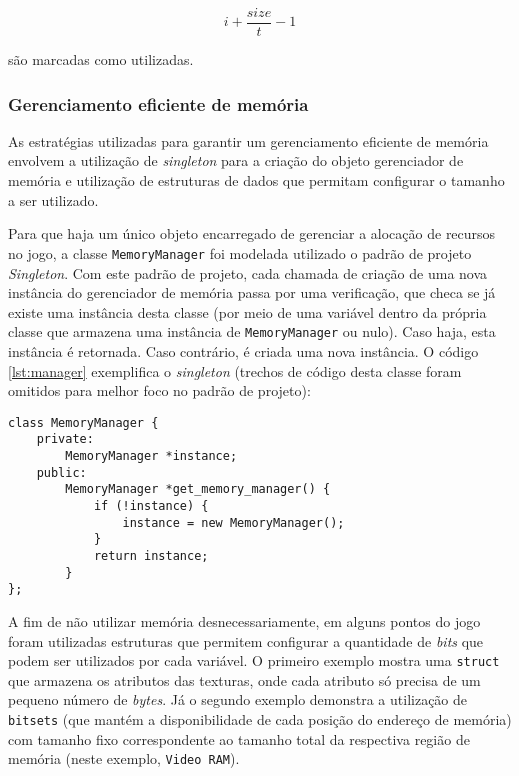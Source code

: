     \begin{equation} \label{Limite superior de alocação na memória de uma posição i}
    i + \frac{size}{t} - 1
    \end{equation}

    são marcadas como utilizadas.

    \subsubsection{Gerenciamento eficiente de memória}

    As estratégias utilizadas para garantir um gerenciamento eficiente de memória envolvem a utilização de \textit{singleton} para a criação do objeto gerenciador de memória e utilização de estruturas de dados que permitam configurar o tamanho a ser utilizado.

    Para que haja um único objeto encarregado de gerenciar a alocação de recursos no jogo, a classe \texttt{MemoryManager} foi modelada utilizado o padrão de projeto \textit{Singleton}. Com este padrão de projeto, cada chamada de criação de uma nova instância do gerenciador de memória passa por uma verificação, que checa se já existe uma instância desta classe (por meio de uma variável dentro da própria classe que armazena uma instância de \texttt{MemoryManager} ou nulo). Caso haja, esta instância é retornada. Caso contrário, é criada uma nova instância. O código \ref{lst:manager} exemplifica o \textit{singleton} (trechos de código desta classe foram omitidos para melhor foco no padrão de projeto):

\begin{lstlisting}[caption={\textit{Singleton} do gerenciador de memória.},label={lst:manager}]
class MemoryManager {
    private:
        MemoryManager *instance;
    public:
        MemoryManager *get_memory_manager() {
            if (!instance) {
                instance = new MemoryManager();
            }
            return instance;
        }
};
\end{lstlisting}

A fim de não utilizar memória desnecessariamente, em alguns pontos do jogo foram utilizadas estruturas que permitem configurar a quantidade de \textit{bits} que podem ser utilizados por cada variável. O primeiro exemplo mostra uma \texttt{struct} que armazena os atributos das texturas, onde cada atributo só precisa de um pequeno número de \textit{bytes}. Já o segundo exemplo demonstra a utilização de \texttt{bitsets} (que mantém a disponibilidade de cada posição do endereço de memória) com tamanho fixo correspondente ao tamanho total da respectiva região de memória (neste exemplo, \texttt{Video RAM}).

